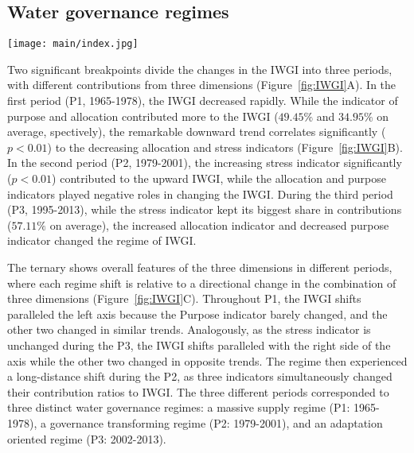\subsection{Water governance regimes}
\label{Res.1}

\begin{figure*}[ht!]
	\centering
	\texttt{[image: main/index.jpg]}
	\caption{Changes in the IWGI index and corresponding water governance regimes: P1: 1965-1978, P2: 1979-2001, and P3: 2002-2013.
	\textbf{A,} detecting change points of IWGI and contributions from each indicator. Two significant change points ($p<0.01$) occurred in 1978 and 2001.
	\textbf{B,} correlation of trends between the IWGI and the indicators.
	\textbf{C,} across three indicators, changing components of the IWGI, whose directions shifts between different regimes.
	}
	\label{fig:IWGI}
\end{figure*}

Two significant breakpoints divide the changes in the IWGI into three periods, with different contributions from three dimensions (Figure~\ref{fig:IWGI}A).
In the first period (P1, 1965-1978), the IWGI decreased rapidly.
While the indicator of purpose and allocation contributed more to the IWGI ($49.45\%$ and $34.95\%$ on average, spectively), the remarkable downward trend correlates significantly ($p<0.01$) to the decreasing allocation and stress indicators (Figure~\ref{fig:IWGI}B).
In the second period (P2, 1979-2001), the increasing stress indicator significantly ($p<0.01$) contributed to the upward IWGI, while the allocation and purpose indicators played negative roles in changing the IWGI.
During the third period (P3, 1995-2013), while the stress indicator kept its biggest share in contributions ($57.11\%$ on average), the increased allocation indicator and decreased purpose indicator changed the regime of IWGI.

The ternary shows overall features of the three dimensions in different periods, where each regime shift is relative to a directional change in the combination of three dimensions (Figure~\ref{fig:IWGI}C).
Throughout P1, the IWGI shifts paralleled the left axis because the Purpose indicator barely changed, and the other two changed in similar trends.
Analogously, as the stress indicator is unchanged during the P3, the IWGI shifts paralleled with the right side of the axis while the other two changed in opposite trends.
The regime then experienced a long-distance shift during the P2, as three indicators simultaneously changed their contribution ratios to IWGI.
The three different periods corresponded to three distinct water governance regimes: a massive supply regime (P1: 1965-1978), a governance transforming regime (P2: 1979-2001), and an adaptation oriented regime (P3: 2002-2013).


